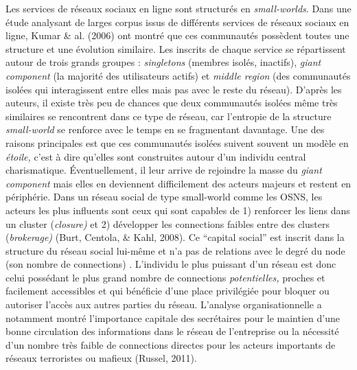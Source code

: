 Les services de r\'eseaux sociaux en ligne sont structur\'es en
\textit{small-worlds}. Dans une \'etude analysant de larges corpus
issus de diff\'erents services de r\'eseaux sociaux en ligne, Kumar \&
al. (2006) ont montr\'e que ces communaut\'es poss\`edent toutes une
structure et une \'evolution similaire. Les inscrits de chaque service
se r\'epartissent autour de trois grands groupes : \textit{singletons}
(membres isol\'es, inactifs), \textit{giant component} (la majorit\'e
des utilisateurs actifs) et \textit{middle region} (des communaut\'es
isol\'ees qui interagissent entre elles mais pas avec le reste du
r\'eseau). D{\textquoteright}apr\`es les auteurs, il existe tr\`es peu
de chances que deux communaut\'es isol\'ees m\^eme tr\`es similaires se
rencontrent dans ce type de r\'eseau, car l{\textquoteright}entropie de
la structure \textit{small-world }se renforce avec le temps en se
fragmentant davantage. Une des raisons principales est que ces
communaut\'es isol\'ees suivent souvent un mod\`ele en
\textit{\'etoile, }c{\textquoteright}est \`a dire
qu{\textquoteright}elles sont construites autour d{\textquoteright}un
individu central charismatique. \'Eventuellement, il leur arrive de
rejoindre la masse du \textit{giant component} mais elles en deviennent
difficilement des acteurs majeurs et restent en p\'eriph\'erie. Dans un
r\'eseau social de type small-world comme les OSNS, les acteurs les
plus influents sont ceux qui sont capables de 1) renforcer les liens
dans un cluster (\textit{closure)} et 2) d\'evelopper les connections
faibles entre des clusters (\textit{brokerage)} (Burt, Centola, \&
Kahl, 2008). Ce {\textquotedblleft}capital social{\textquotedblright}
est inscrit dans la structure du r\'eseau social lui-m\^eme \cite{Lin1999}
et n{\textquoteright}a pas de relations avec le degr\'e du node (son
nombre de connections) \cite{Cha et al.2010}. L{\textquoteright}individu
le plus puissant d{\textquoteright}un r\'eseau est donc celui
poss\'edant le plus grand nombre de connections \textit{potentielles,
}proches et facilement accessibles et qui b\'en\'eficie
d{\textquoteright}une place privil\'egi\'ee pour bloquer ou autoriser
l{\textquoteright}acc\`es aux autres parties du r\'eseau.
L{\textquoteright}analyse organisationnelle a notamment montr\'e
l{\textquoteright}importance capitale des secr\'etaires pour le
maintien d{\textquoteright}une bonne circulation des informations dans
le r\'eseau de l{\textquoteright}entreprise ou la n\'ecessit\'e
d{\textquoteright}un nombre tr\`es faible de connections directes pour
les acteurs importants de r\'eseaux terroristes ou mafieux (Russel,
2011). 

